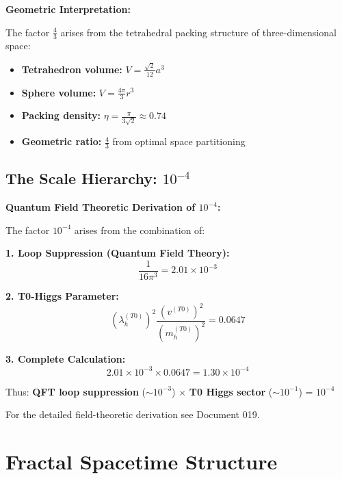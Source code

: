 	\begin{alternative}
		\textbf{Geometric Interpretation:}
		
		The factor $\frac{4}{3}$ arises from the tetrahedral packing structure of three-dimensional space:
		\begin{itemize}
			\item \textbf{Tetrahedron volume:} $V = \frac{\sqrt{2}}{12}a^3$
			\item \textbf{Sphere volume:} $V = \frac{4\pi}{3}r^3$ 
			\item \textbf{Packing density:} $\eta = \frac{\pi}{3\sqrt{2}} \approx 0.74$
			\item \textbf{Geometric ratio:} $\frac{4}{3}$ from optimal space partitioning
		\end{itemize}
	\end{alternative}
	
	\subsection{The Scale Hierarchy: $10^{-4}$}
	
	\begin{foundation}
		\textbf{Quantum Field Theoretic Derivation of $10^{-4}$:}
		
		The factor $10^{-4}$ arises from the combination of:
		
		\textbf{1. Loop Suppression (Quantum Field Theory):}
		\begin{equation}
			\frac{1}{16\pi^3} = 2.01 \times 10^{-3}
		\end{equation}
		
		\textbf{2. T0-Higgs Parameter:}
		\begin{equation}
			(\lambda_h^{(T0)})^2 \frac{(v^{(T0)})^2}{(m_h^{(T0)})^2} = 0.0647
		\end{equation}
		
		\textbf{3. Complete Calculation:}
		\begin{equation}
			2.01 \times 10^{-3} \times 0.0647 = 1.30 \times 10^{-4}
		\end{equation}
		
		Thus: \textbf{QFT loop suppression} ($\sim 10^{-3}$) $\times$ \textbf{T0 Higgs sector} ($\sim 10^{-1}$) = $10^{-4}$
		
		For the detailed field-theoretic derivation see Document 019.
	\end{foundation}
	
	\section{Fractal Spacetime Structure}
	
